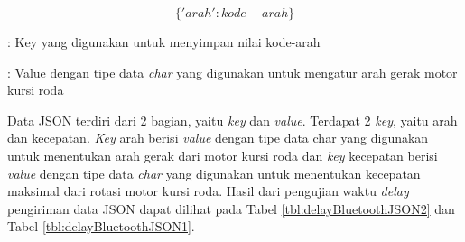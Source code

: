 \begin{equation}
  \label{eq:json-1data}
    \{'arah': kode-arah\}
\end{equation}

\begin{description}[nolistsep]
  \item[Keterangan]
  \item[arah] : Key yang digunakan untuk menyimpan nilai kode-arah
  \item[kode-arah] : Value dengan tipe data \emph{char} yang digunakan untuk mengatur arah gerak motor kursi roda
\end{description}

Data JSON terdiri dari 2 bagian, yaitu \emph{key} dan \emph{value}. Terdapat 2 \emph{key}, yaitu arah dan kecepatan. \emph{Key} arah berisi \emph{value} dengan tipe data char yang digunakan untuk menentukan arah gerak dari motor kursi roda dan \emph{key} kecepatan berisi \emph{value} dengan tipe data \emph{char} yang digunakan untuk menentukan kecepatan maksimal dari rotasi motor kursi roda. Hasil dari pengujian waktu \emph{delay} pengiriman data JSON dapat dilihat pada Tabel \ref{tbl:delayBluetoothJSON2} dan Tabel \ref{tbl:delayBluetoothJSON1}.

